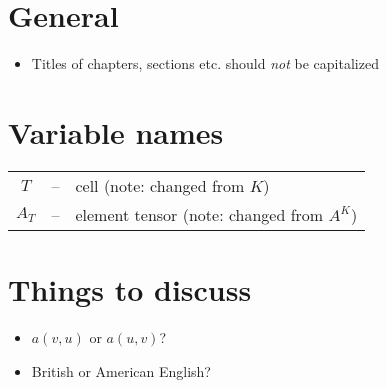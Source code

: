 \documentclass{article}
\begin{document}
\linespread{1.2}

\section*{General}

\begin{itemize}
\item
  Titles of chapters, sections etc. should \emph{not} be capitalized
\end{itemize}

\section*{Variable names}

\begin{tabular}{ccl}
  $T$ &--&
  cell (note: changed from $K$) \\
  $A_T$ &--&
  element tensor (note: changed from $A^K$) \\
\end{tabular}

\section*{Things to discuss}

\begin{itemize}
\item
  $a(v, u)$ or $a(u, v)$?
\item
  British or American English?
\end{itemize}
\end{document}
